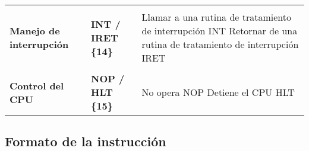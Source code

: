 \documentclass[12pt,twoside]{templates/unerthesis}
\begin{document}
\begin{longtable}[]{@{}lll@{}}
\begin{minipage}[t]{0.30\columnwidth}
\strut
\end{minipage} & \begin{minipage}[t]{0.30\columnwidth}\raggedright
\strut
\end{minipage} & \begin{minipage}[t]{0.30\columnwidth}\raggedright
\strut
\end{minipage}\tabularnewline
\begin{minipage}[t]{0.30\columnwidth}\raggedright
\textbf{Manejo de interrupción}\strut
\end{minipage} & \begin{minipage}[t]{0.30\columnwidth}\raggedright
\textbf{INT / IRET \{14\}}\strut
\end{minipage} & \begin{minipage}[t]{0.30\columnwidth}\raggedright
Llamar a una rutina de tratamiento de interrupción INT Retornar de una rutina de tratamiento de interrupción IRET\strut
\end{minipage}\tabularnewline
\begin{minipage}[t]{0.30\columnwidth}\raggedright
\strut
\end{minipage} & \begin{minipage}[t]{0.30\columnwidth}\raggedright
\strut
\end{minipage} & \begin{minipage}[t]{0.30\columnwidth}\raggedright
\strut
\end{minipage}\tabularnewline
\begin{minipage}[t]{0.30\columnwidth}\raggedright
\textbf{Control del CPU}\strut
\end{minipage} & \begin{minipage}[t]{0.30\columnwidth}\raggedright
\textbf{NOP / HLT \{15\}}\strut
\end{minipage} & \begin{minipage}[t]{0.30\columnwidth}\raggedright
No opera NOP Detiene el CPU HLT\strut
\end{minipage}\tabularnewline
\bottomrule
\end{longtable}

\hypertarget{formato-de-la-instrucciuxf3n}{%
\subsection{Formato de la instrucción}\label{formato-de-la-instrucciuxf3n}}
\end{document}
